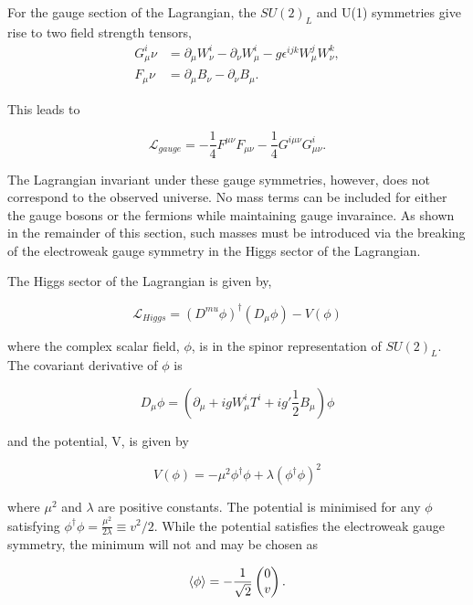 For the gauge section of the Lagrangian, the $SU(2)_L$ and U(1) symmetries give rise to two field strength tensors,
\begin{align}
G^i_\mu\nu &= \partial_\mu W^i_\nu - \partial_\nu W^i_\mu - g \epsilon^{ijk}W^j_\mu W^k_\nu,\\
F_\mu\nu &= \partial_\mu B_\nu - \partial_\nu B_\mu.
\end{align}

This leads to

\begin{equation}
\mathcal{L}_{gauge} = -\frac{1}{4}F^{\mu\nu}F_{\mu\nu} - \frac{1}{4}G^{i\mu\nu}G^{i}_{\mu\nu}.
\end{equation}

The Lagrangian invariant under these gauge symmetries, however, does not correspond to the observed universe. No mass terms
can be included for either the gauge bosons or the fermions while maintaining gauge invaraince.
As shown in the remainder of this section, such masses must be introduced via the breaking
of the electroweak gauge symmetry in the Higgs sector of the Lagrangian. 

The Higgs sector of the Lagrangian is given by,

\begin{equation}
\label{equ:higgs-lagrangian}
\mathcal{L}_{Higgs} = (D^{mu}\phi)^{\dagger}(D_{\mu}\phi) - V(\phi)
\end{equation}

where the complex scalar field, $\phi$, is in the spinor representation of $SU(2)_L$. The covariant derivative of $\phi$ is

\begin{equation}
D_{\mu} \phi = (\partial_\mu + igW^i_{\mu}T^i + ig'\frac{1}{2}B_\mu)\phi 
\end{equation}

and the potential, V, is given by

\begin{equation}
V(\phi) =  - \mu^2\phi^{\dagger}\phi + \lambda \left(\phi^{\dagger}\phi\right)^2
\end{equation}

where $\mu^2$ and $\lambda$ are positive constants. The potential is minimised for any $\phi$ satisfying
$\phi^{\dagger}\phi = \frac{\mu^2}{2\lambda} \equiv v^2/2$. While the potential satisfies the 
electroweak gauge symmetry, the minimum will not and may be chosen as

\begin{equation}
\braket{\phi} =  - \frac{1}{\sqrt{2}}\begin{pmatrix} 0 \\ v\end{pmatrix}.
\end{equation}

